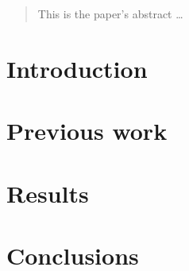 \documentclass[12pt]{article}
\begin{document}
\maketitle

\begin{abstract}
This is the paper's abstract \ldots
\end{abstract}

\section{Introduction}

\section{Previous work}\label{previous work}

\section{Results}\label{results}

\section{Conclusions}\label{conclusions}



\end{document}
